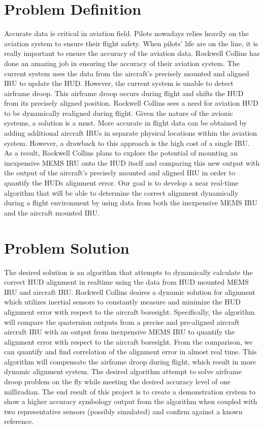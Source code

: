 \documentclass[letterpaper,10pt,titlepage]{article}
\begin{document}
\section*{Problem Definition}
Accurate data is critical in aviation field. Pilots nowadays relies heavily on the aviation system to ensure their flight safety. When pilots’ life are on the line, it is really important to ensure the accuracy of the aviation data. Rockwell Collins has done an amazing job in ensuring the accuracy of their aviation system. The current system uses the data from the aircraft’s precisely mounted and aligned IRU to update the HUD. However, the current system is unable to detect airframe droop. This airframe droop occurs during flight and shifts the HUD from its precisely aligned position. Rockwell Collins sees a need for aviation HUD to be dynamically realigned during flight. Given the nature of the avionic systems, a solution is a must. More accurate in flight data can be obtained by adding additional aircraft IRUs in separate physical locations within the aviation system. However, a drawback to this approach is the high cost of a single IRU. As a result, Rockwell Collins plans to explore the potential of mounting an inexpensive MEMS IRU onto the HUD itself and comparing this new output with the output of the aircraft’s precisely mounted and aligned IRU in order to quantify the HUDs alignment error. Our goal is to develop a near real-time algorithm that will be able to determine the correct alignment dynamically during a flight environment by using data from both the inexpensive MEMS IRU and the aircraft mounted IRU.

\section*{Problem Solution}
The desired solution is an algorithm that attempts to dynamically calculate the correct HUD alignment in realtime using the data from HUD mounted MEMS IRU and aircraft IRU. Rockwell Collins desires a dynamic solution for alignment which utilizes inertial sensors to constantly measure and minimize the HUD alignment error with respect to the aircraft boresight. Specifically, the algorithm will compare the quaternion outputs from a precise and pre-aligned aircraft aircraft IRU with an output from inexpensive MEMS IRU to quantify the alignment error with respect to the aircraft boresight. From the comparison, we can quantify and find correlation of the alignment error in almost real time. This algorithm will compensate the airframe droop during flight, which result in more dynamic alignment system. The desired algorithm attempt to solve airframe droop problem on the fly while meeting the desired accuracy level of one milliradian. The end result of this project is to create a demonstration system to show a higher accuracy symbology output from the algorithm when coupled with two representative sensors (possibly simulated) and confirm against a known reference.
\end{document}
